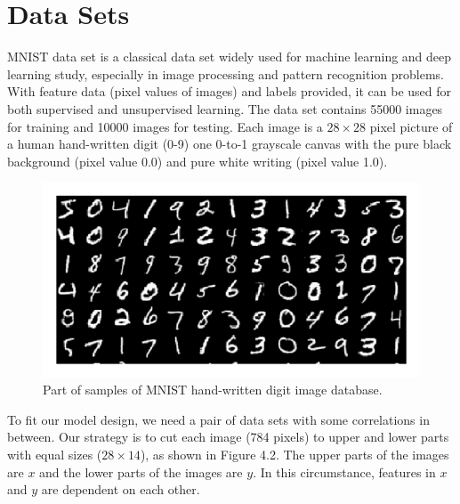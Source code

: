 \documentclass[12pt]{report} %
\begin{document}
\section{Data Sets}
MNIST data set\cite{MNIST} is a classical data set widely used for machine learning and deep learning study, especially in image processing and pattern recognition problems. With feature data (pixel values of images) and labels provided, it can be used for both supervised and unsupervised learning. The data set contains 55000 images for training and 10000 images for testing. Each image is a $28 \times 28$ pixel picture of a human hand-written digit (0-9) one 0-to-1 grayscale canvas with the pure black background (pixel value 0.0) and pure white writing (pixel value 1.0).
\begin{figure}[H]
	\centering
	\includegraphics[scale=2.5]{pictures/MNIST.png}
	\caption{Part of samples of MNIST hand-written digit image database\cite{MNISTPIC}.}
	\label{fig:1}
\end{figure}

To fit our model design, we need a pair of data sets with some correlations in between. Our strategy is to cut each image (784 pixels) to upper and lower parts with equal sizes ($28 \times 14$), as shown in Figure 4.2. The upper parts of the images are $x$ and the lower parts of the images are $y$. In this circumstance, features in $x$ and $y$ are dependent on each other.
\end{document}
